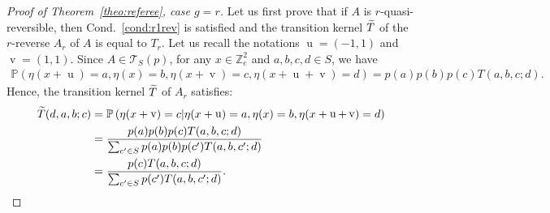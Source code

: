\documentclass[AHL,Unicode,longabstracts]{cedram}
\let\oldtilde\tilde
\renewcommand*{\tilde}[1]{\mathchoice{\widetilde{#1}}{\widetilde{#1}}{\oldtilde{#1}}{\oldtilde{#1}}}
\newcounter{a}
\newcommand{\Cond}{Cond.}
\newcommand{\triang}[2]{\mathcal{T}_{#1} \left(#2 \right)}
\newcommand{\Z}{\mathbb{Z}}
\newcommand{\Pbb}{\mathbb{P}}
\DeclareMathOperator{\vu}{u}
\DeclareMathOperator{\vv}{v}
\begin{document}
\goodbreak
\begin{proof}[Proof of Theorem~\ref{theo:referee}, case $g=r$]
Let us first prove that if $A$ is $r$-quasi-reversible, then \Cond~\ref{cond:r1rev} is satisfied and the transition kernel $\tilde T$ of the $r$-reverse $A_r$ of $A$ is equal to $T_r$. Let us recall the notations $\vu=(-1,1)$ and $\vv=(1,1)$. Since $A \in \triang{S}{p}$, for any $x \in \Z_{e}^2$ and $a,b,c,d \in S$, we have
\begin{align*}
\Pbb\left(\eta(x+\vu) = a, \eta(x) = b, \eta(x + \vv) = c, \eta(x+\vu+\vv) = d\right) = p(a) p(b) p(c) T(a,b,c;d).
\end{align*}
Hence, the transition kernel $\tilde T$ of $A_r$ satisfies:
\begin{equation}
\begin{aligned}
\tilde T(d,a,b;c)& = \Pbb\left(\eta(x + \vv) = c | \eta(x + \vu) = a, \eta(x) = b, \eta(x + \vu + \vv) = d\right) \\
& = \frac{p(a) p(b) p(c) T(a,b,c;d)}{\sum_{c'\in S} p(a) p(b) p(c') T(a,b,c';d)}  \\
& = \frac{p(c) T(a,b,c;d)}{\sum_{c'\in S} p(c') T(a,b,c';d)}. \label{eq:uniquerev}
\end{aligned}
\end{equation}


\end{proof}
\end{document}

